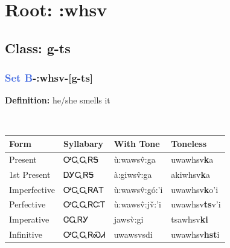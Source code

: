 \needspace{4in}
\section*{Root: :whsv}
\nopagebreak
{}
\needspace{3in}
\subsection*{Class: g-ts}
\nopagebreak
\needspace{2in}
\subsubsection*{\textcolor{RoyalBlue}{Set B}{-}\textbf{:whsv}{-}[g-ts]}
\nopagebreak
\textbf{Definition: } he/she smells it
\\[0.5em]
\begin{tabularx}{\textwidth}{l X X X}%
\toprule%
\textbf{Form}&\textbf{Syllabary}&\textbf{With Tone}&\textbf{Toneless}\\%
\midrule%
Present&ᎤᏩᏩᏒᎦ&ù:wawsv̂:ga&uwawhsv\textbf{k}a\\%
1st Present&ᎠᎩᏩᏒᎦ&à:giwsv̂:ga&akiwhsv\textbf{k}a\\%
Imperfective&ᎤᏩᏩᏒᎪᎢ&ù:wawsv̂:gó:’i&uwawhsv\textbf{k}o'i\\%
Perfective&ᎤᏩᏩᏒᏨᎢ&ù:wawsv̂:jv̌:’i&uwawhsv\textbf{ts}v'i\\%
Imperative&ᏣᏩᏒᎩ&jawsv̀:gi&tsawhsv\textbf{ki}\\%
Infinitive&ᎤᏩᏩᏒᏍᏗ&uwawsvsdi&uwawhsv\textbf{hst}i\\%
\bottomrule%
\end{tabularx}
\\[1em]